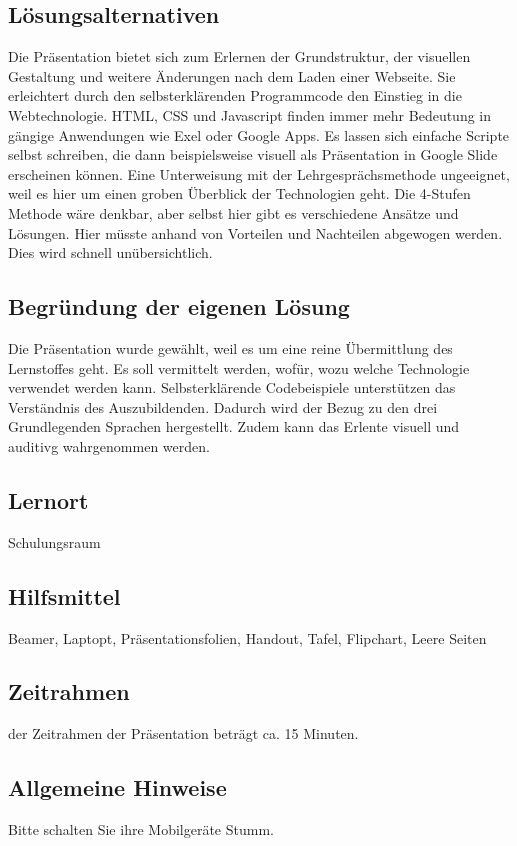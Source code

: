 \documentclass[a4paper, 12pt]{article}
\begin{document}
   	\subsection{Lösungsalternativen}
   	Die Präsentation bietet sich zum Erlernen der Grundstruktur, der visuellen Gestaltung und weitere Änderungen nach dem Laden einer Webseite. Sie erleichtert durch den selbsterklärenden Programmcode den Einstieg in die Webtechnologie. HTML, CSS und Javascript finden immer mehr Bedeutung in gängige Anwendungen wie Exel oder Google Apps. Es lassen sich einfache Scripte selbst schreiben, die dann beispielsweise visuell als Präsentation in Google Slide erscheinen können. Eine Unterweisung mit der Lehrgesprächsmethode ungeeignet, weil es hier um einen groben Überblick der Technologien geht. Die 4-Stufen Methode wäre denkbar, aber selbst hier gibt es verschiedene Ansätze und Lösungen. Hier müsste anhand von Vorteilen und Nachteilen abgewogen werden. Dies wird schnell unübersichtlich.

	\subsection{Begründung der eigenen Lösung}
	Die Präsentation wurde gewählt, weil es um eine reine Übermittlung des Lernstoffes geht. Es soll vermittelt werden, wofür, wozu welche Technologie verwendet werden kann. Selbsterklärende Codebeispiele unterstützen das Verständnis des Auszubildenden. Dadurch wird der Bezug zu den drei Grundlegenden Sprachen hergestellt. Zudem kann das Erlente visuell und auditivg wahrgenommen werden.
	
   
   \subsection{Lernort}
   	Schulungsraum
   
   \subsection{Hilfsmittel}
   	Beamer, Laptopt, Präsentationsfolien, Handout, Tafel, Flipchart, Leere Seiten
   	
   	\subsection{Zeitrahmen}
     der Zeitrahmen der Präsentation beträgt ca. 15 Minuten.
   
	\subsection{Allgemeine Hinweise}
	Bitte schalten Sie ihre Mobilgeräte Stumm.
\end{document}
